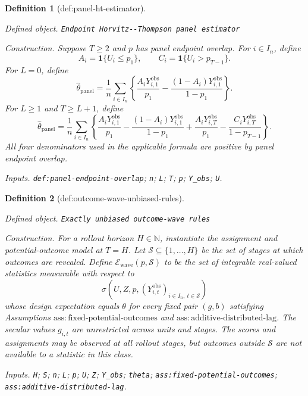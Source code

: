 \documentclass{article}
\newtheorem{definition}{Definition}
\begin{document}
\begin{definition}[def:panel-ht-estimator]\label{def:panel-ht-estimator}
\par\smallskip\noindent\emph{Defined object.} \texttt{Endpoint Horvitz-\allowbreak{}-\allowbreak{}Thompson panel estimator}
\par\smallskip\noindent\emph{Construction.} Suppose \(T\ge2\) and \(p\) has panel endpoint overlap.  For \(i\in I_n\), define
\[
 A_i=\mathbf 1\{U_i\le p_1\},
 \qquad C_i=\mathbf 1\{U_i>p_{T-1}\}.
\]
For \(L=0\), define
\[
 \widehat\theta_{\mathrm{panel}}
 =\frac1n\sum_{i\in I_n}
 \left\{
 \frac{A_iY^{\mathrm{obs}}_{i,1}}{p_1}
 -\frac{(1-A_i)Y^{\mathrm{obs}}_{i,1}}{1-p_1}
 \right\}.
\]
For \(L\ge1\) and \(T\ge L+1\), define
\[
 \widehat\theta_{\mathrm{panel}}
 =\frac1n\sum_{i\in I_n}
 \left\{
 \frac{A_iY^{\mathrm{obs}}_{i,1}}{p_1}
 -\frac{(1-A_i)Y^{\mathrm{obs}}_{i,1}}{1-p_1}
 +\frac{A_iY^{\mathrm{obs}}_{i,T}}{p_1}
 -\frac{C_iY^{\mathrm{obs}}_{i,T}}{1-p_{T-1}}
 \right\}.
\]
All four denominators used in the applicable formula are positive by panel endpoint overlap.
\par\smallskip\noindent\emph{Inputs.} \texttt{def:\allowbreak{}panel-\allowbreak{}endpoint-\allowbreak{}overlap}; \texttt{n}; \texttt{L}; \texttt{T}; \texttt{p}; \texttt{Y\_\allowbreak{}obs}; \texttt{U}.
\end{definition}

\begin{definition}[def:outcome-wave-unbiased-rules]\label{def:outcome-wave-unbiased-rules}
\par\smallskip\noindent\emph{Defined object.} \texttt{Exactly unbiased outcome-\allowbreak{}wave rules}
\par\smallskip\noindent\emph{Construction.} For a rollout horizon \(H\in\mathbb N\), instantiate the assignment and potential-outcome model at \(T=H\).  Let \(\mathcal S\subseteq\{1,\ldots,H\}\) be the set of stages at which outcomes are revealed.  Define \(\mathcal E_{\mathrm{wave}}(p,\mathcal S)\) to be the set of integrable real-valued statistics measurable with respect to
\[
 \sigma\!\left(U,Z,p,
       (Y^{\mathrm{obs}}_{i,t})_{i\in I_n,\ t\in\mathcal S}\right)
\]
whose design expectation equals \(\theta\) for every fixed pair \((g,b)\) satisfying Assumptions \(\mathrm{ass:fixed\text{-}potential\text{-}outcomes}\) and \(\mathrm{ass:additive\text{-}distributed\text{-}lag}\).  The secular values \(g_{i,t}\) are unrestricted across units and stages.  The scores and assignments may be observed at all rollout stages, but outcomes outside \(\mathcal S\) are not available to a statistic in this class.
\par\smallskip\noindent\emph{Inputs.} \texttt{H}; \texttt{S}; \texttt{n}; \texttt{L}; \texttt{p}; \texttt{U}; \texttt{Z}; \texttt{Y\_\allowbreak{}obs}; \texttt{theta}; \texttt{ass:\allowbreak{}fixed-\allowbreak{}potential-\allowbreak{}outcomes}; \texttt{ass:\allowbreak{}additive-\allowbreak{}distributed-\allowbreak{}lag}.
\end{definition}
\end{document}
